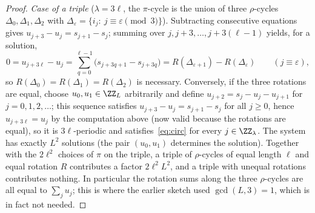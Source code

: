 \begin{proof}
\emph{Case of a triple} ($\lambda=3\ell$, the $\pi$-cycle is the union of three $\rho$-cycles $\Delta_0,\Delta_1,\Delta_2$ with $\Delta_\varepsilon=\{i_j:\ j\equiv\varepsilon\pmod 3\}$). Subtracting consecutive equations gives $u_{j+3}-u_j=s_{j+1}-s_j$; summing over $j,j+3,\ldots,j+3(\ell-1)$ yields, for a solution,
\[
0=u_{j+3\ell}-u_j=\sum_{q=0}^{\ell-1}\bigl(s_{j+3q+1}-s_{j+3q}\bigr)=R(\Delta_{\varepsilon+1})-R(\Delta_{\varepsilon})\qquad(j\equiv\varepsilon),
\]
so $R(\Delta_0)=R(\Delta_1)=R(\Delta_2)$ is necessary. Conversely, if the three rotations are equal, choose $u_0,u_1\in\ZZ_L$ arbitrarily and define $u_{j+2}=s_j-u_j-u_{j+1}$ for $j=0,1,2,\ldots$; this sequence satisfies $u_{j+3}-u_j=s_{j+1}-s_j$ for all $j\ge0$, hence $u_{j+3\ell}=u_j$ by the computation above (now valid because the rotations are equal), so it is $3\ell$-periodic and satisfies~\eqref{eq:circ} for every $j\in\ZZ_\lambda$. The system has exactly $L^{2}$ solutions (the pair $(u_0,u_1)$ determines the solution). Together with the $2\ell^{2}$ choices of $\pi$ on the triple, a triple of $\rho$-cycles of equal length $\ell$ and equal rotation $R$ contributes a factor $2\ell^{2}L^{2}$, and a triple with unequal rotations contributes nothing. In particular the rotation sums along the three $\rho$-cycles are all equal to $\sum_j u_j$; this is where the earlier sketch used $\gcd(L,3)=1$, which is in fact not needed.


\end{proof}

